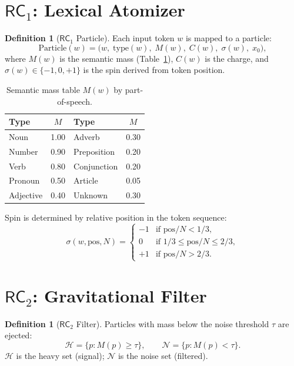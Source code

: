 \documentclass[11pt,twoside]{article}
\theoremstyle{plain}
\theoremstyle{definition}
\newtheorem{definition}[theorem]{Definition}
\theoremstyle{remark}
\newcommand{\RC}[1]{\textsf{RC}_{#1}}
\begin{document}
\section{\texorpdfstring{$\RC{1}$}{RC1}: Lexical Atomizer}

\begin{definition}[$\RC{1}$ Particle]\label{def:rc1}
Each input token $w$ is mapped to a particle:
\begin{equation}
  \mathrm{Particle}(w) = \bigl(w,\;\mathrm{type}(w),\;M(w),\;C(w),\;\sigma(w),\;x_0\bigr),
\end{equation}
where $M(w)$ is the semantic mass (Table~\ref{tab:mass}), $C(w)$ is the
charge, and $\sigma(w)\in\{-1,0,+1\}$ is the spin derived from token position.
\end{definition}

\begin{table}[h!]
\centering\small
\caption{Semantic mass table $M(w)$ by part-of-speech.}\label{tab:mass}
\begin{tabular}{lc|lc}
\toprule
Type & $M$ & Type & $M$ \\
\midrule
Noun          & 1.00 & Adverb       & 0.30 \\
Number        & 0.90 & Preposition  & 0.20 \\
Verb          & 0.80 & Conjunction  & 0.20 \\
Pronoun       & 0.50 & Article      & 0.05 \\
Adjective     & 0.40 & Unknown      & 0.30 \\
\bottomrule
\end{tabular}
\end{table}

Spin is determined by relative position in the token sequence:
\begin{equation}\label{eq:spin}
  \sigma(w,\mathrm{pos},N) =
  \begin{cases}
    -1 & \text{if } \mathrm{pos}/N < 1/3,\\
     0 & \text{if } 1/3 \le \mathrm{pos}/N \le 2/3,\\
    +1 & \text{if } \mathrm{pos}/N > 2/3.
  \end{cases}
\end{equation}

\section{\texorpdfstring{$\RC{2}$}{RC2}: Gravitational Filter}

\begin{definition}[$\RC{2}$ Filter]
Particles with mass below the noise threshold $\tau$ are ejected:
\begin{equation}
  \mathcal{H} = \{p : M(p) \ge \tau\},\qquad
  \mathcal{N} = \{p : M(p) < \tau\}.
\end{equation}
$\mathcal{H}$ is the heavy set (signal); $\mathcal{N}$ is the noise set (filtered).
\end{definition}
\end{document}
